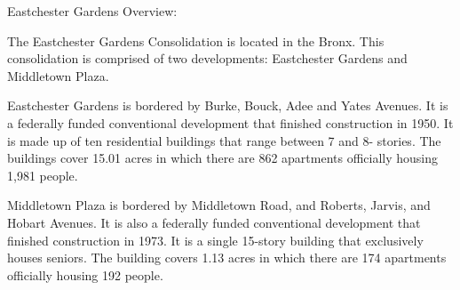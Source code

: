 Eastchester Gardens Overview:

The Eastchester Gardens Consolidation is located in the Bronx. This consolidation is comprised of two developments: Eastchester Gardens and Middletown Plaza.

Eastchester Gardens is bordered by Burke, Bouck, Adee and Yates Avenues.  It is a federally funded conventional development that finished construction in 1950. It is made up of ten residential buildings that range between 7 and 8- stories. The buildings cover 15.01 acres in which there are 862 apartments officially housing 1,981 people.   

  

Middletown Plaza is bordered by Middletown Road, and Roberts, Jarvis, and Hobart Avenues. It is also a federally funded conventional development that finished construction in 1973. It is a single 15-story building that exclusively houses seniors. The building covers 1.13 acres in which there are 174 apartments officially housing 192 people.